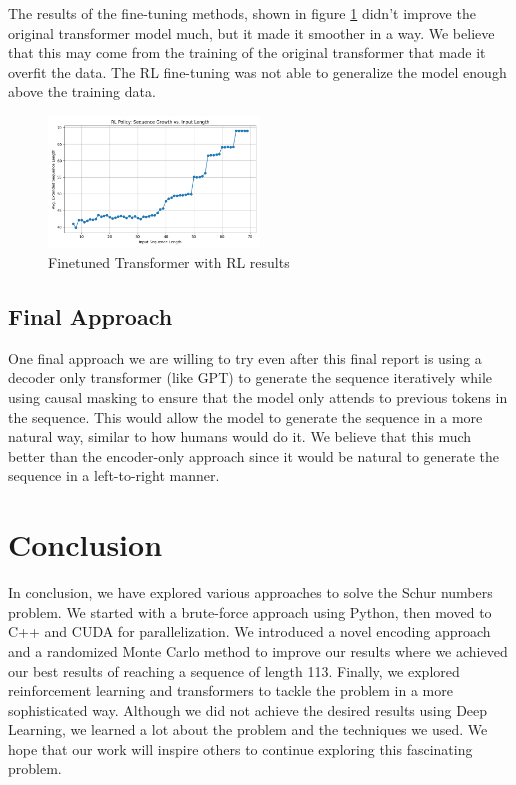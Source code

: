 \documentclass[12pt]{article}
\begin{document}
The results of the fine-tuning methods, shown in figure \ref{fig:transformerRL} didn't improve the original transformer model much, but it made it smoother in a way. We believe that this may come from the training of the original transformer that made it overfit the data. The RL fine-tuning was not able to generalize the model enough above the training data.

\begin{figure}[h]
    \centering
    \includegraphics[width=0.5\textwidth]{images/RLresultsFineTuned.png}
    \caption{Finetuned Transformer with RL results}
    \label{fig:transformerRL}
\end{figure}
\subsection{Final Approach}
One final approach we are willing to try even after this final report is using a decoder only transformer (like GPT) to generate the sequence iteratively while using causal masking to ensure that the model only attends to previous tokens in the sequence. This would allow the model to generate the sequence in a more natural way, similar to how humans would do it. We believe that this much better than the encoder-only approach since it would be natural to generate the sequence in a left-to-right manner.

\section{Conclusion}
In conclusion, we have explored various approaches to solve the Schur numbers problem. We started with a brute-force approach using Python, then moved to C++ and CUDA for parallelization. We introduced a novel encoding approach and a randomized Monte Carlo method to improve our results where we achieved our best results of reaching a sequence of length 113. Finally, we explored reinforcement learning and transformers to tackle the problem in a more sophisticated way. Although we did not achieve the desired results using Deep Learning, we learned a lot about the problem and the techniques we used. We hope that our work will inspire others to continue exploring this fascinating problem.
\end{document}
